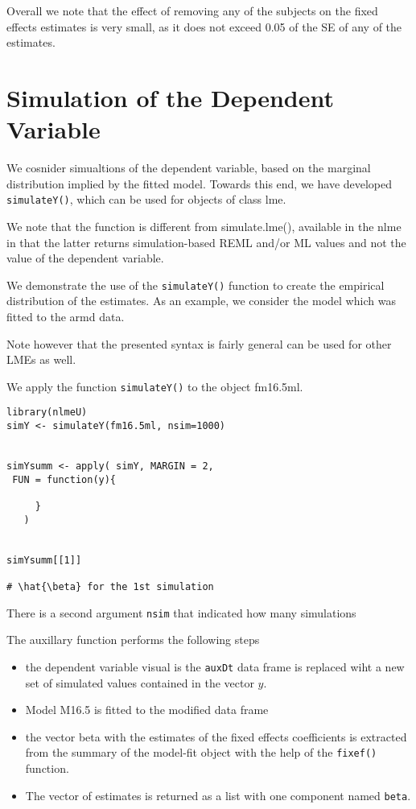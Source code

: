 
Overall we note that the effect of removing any of the subjects on the fixed effects estimates is very small, as it does not exceed 0.05 of the SE of any of the  estimates.

\section{Simulation of the Dependent Variable}

We cosnider simualtions of the dependent variable, based on the marginal distribution 
implied by the fitted model.
Towards this end, we have developed \texttt{simulateY()}, which can be used for objects of class lme.

We note that the function is different from simulate.lme(), available in the nlme in that the latter returns
simulation-based REML and/or ML values and not the value of the dependent variable.

We demonstrate the use of the \texttt{simulateY()} function to create the empirical distribution of the \textbf{\beta} estimates.
As an example, we consider the model which was fitted to the armd data.

Note however that the presented syntax is fairly general can be used for other LMEs as well.

We apply the function \texttt{simulateY()} to the object fm16.5ml.



\begin{framed}
\begin{verbatim}
library(nlmeU)
simY <- simulateY(fm16.5ml, nsim=1000)


simYsumm <- apply( simY, MARGIN = 2, 
 FUN = function(y){

     }
   )


simYsumm[[1]]

# \hat{\beta} for the 1st simulation
\end{verbatim}
\end{framed}

There is a second argument \texttt{nsim} that indicated how many simulations 

The auxillary function performs the following steps

\begin{itemize}
\item the dependent variable visual is the \texttt{auxDt} data frame is replaced wiht a new set of simulated values contained in the vector $y$.
\item Model M16.5 is fitted to the modified data frame
\item the vector beta with the estimates of the fixed effects coefficients is extracted from the summary of the model-fit object with the help of the \texttt{fixef()} function.
\item The vector of estimates is returned as a list with one component named \texttt{beta}.
\end{itemize}


